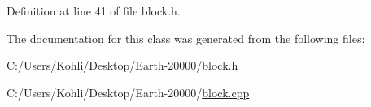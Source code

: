Definition at line 41 of file block.h.

The documentation for this class was generated from the following files:\begin{DoxyCompactItemize}
\item 
C:/Users/Kohli/Desktop/Earth-\/20000/\hyperlink{block_8h}{block.h}\item 
C:/Users/Kohli/Desktop/Earth-\/20000/\hyperlink{block_8cpp}{block.cpp}\end{DoxyCompactItemize}
